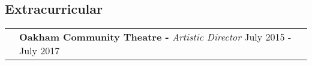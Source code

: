 \documentclass[a4paper, oneside, final]{scrartcl} %
\newcommand{\gray}{\rowcolor[gray]{.90}} %
\begin{document}
\begin{center}


  \vspace{-0.2cm}
  \section{Extracurricular}
  \renewcommand{\arraystretch}{1.3}
  \vspace{-0.05cm}

%
%

  \renewcommand{\arraystretch}{1.3}
  \vspace{-0.05cm}

  \begin{tabularx}{1.00\linewidth}{>{\raggedleft\scshape}p{0cm}X}
    \gray& \textbf{Oakham Community Theatre -} \textit{Artistic Director} \hfill {July 2015 - July 2017}\\
  \end{tabularx}
  \vspace{-0.5cm}
  \begin{itemize} \itemsep-0.2cm
      \vspace{-0.1cm}


\end{itemize}
\end{center}
\end{document}
